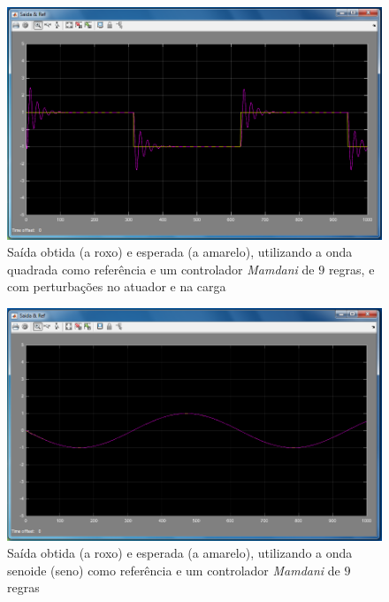 \documentclass{article}
\begin{document}
\begin{figure}[h]
  \centering
      \includegraphics[scale=0.3]{Images/Mamdani_9_square_actuator_charge.png}
  \caption{Saída obtida (a roxo) e esperada (a amarelo), utilizando a onda quadrada como referência e um controlador \emph{Mamdani} de $9$ regras, e com perturbações no atuador e na carga}
\end{figure}


\begin{figure}[h]
  \centering
      \includegraphics[scale=0.3]{Images/Mamdani_9_sin.png}
  \caption{Saída obtida (a roxo) e esperada (a amarelo), utilizando a onda senoide (seno) como referência e um controlador \emph{Mamdani} de $9$ regras}
\end{figure}
\end{document}
